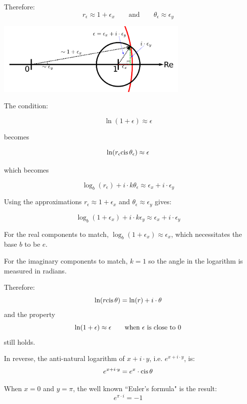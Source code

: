 \documentclass{article}
\newcommand{\cis}{\textnormal{cis}\,}
\begin{document}
Therefore:
\[r_\epsilon \approx 1 + \epsilon_x \quad\quad\text{and}\quad\quad \theta_\epsilon \approx \epsilon_y\]

\begin{center}
\includegraphics[width = 0.7\textwidth]{complex_number_natural_logarithm}
\end{center}

The condition:

\[\ln(1 + \epsilon) \approx \epsilon\] 

becomes

\[\ln(r_\epsilon \cis\theta_\epsilon) \approx \epsilon\] 

which becomes

\[\log_b(r_\epsilon) + i \cdot k\theta_\epsilon \approx \epsilon_x + i \cdot \epsilon_y\]

Using the approximations \(r_\epsilon \approx 1 + \epsilon_x\) and \(\theta_\epsilon \approx \epsilon_y\) gives:

\[\log_b(1 + \epsilon_x) + i \cdot k\epsilon_y \approx \epsilon_x + i \cdot \epsilon_y\]

For the real components to match, \(\log_b(1 + \epsilon_x) \approx \epsilon_x\), which necessitates the base \(b\) to be \(e\). 

For the imaginary components to match, \(k = 1\) so the angle in the logarithm is measured in radians. 

Therefore:
\[\ln(r \cis\theta) = \ln(r) + i \cdot \theta\]
and the property
\[\ln(1 + \epsilon) \approx \epsilon \quad\quad\textnormal{when \(\epsilon\) is close to \(0\)}\]
still holds. 

In reverse, the anti-natural logarithm of \(x + i \cdot y\), i.e. \(e^{x + i \cdot y}\), is:
\[e^{x + i \cdot y} = e^x \cdot \cis\theta\]

When \(x = 0\) and \(y = \pi\), the well known ``Euler's formula" is the result:
\[e^{\pi \cdot i} = -1\]
\end{document}
